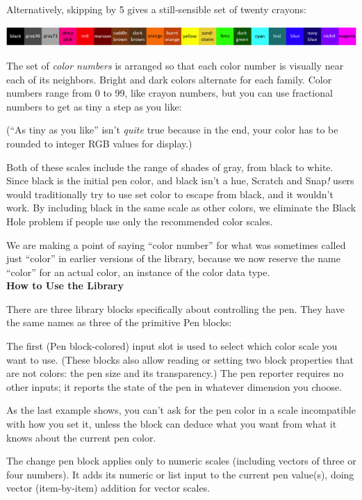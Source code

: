 Alternatively, skipping by 5 gives a still-sensible set of twenty
crayons:

\includegraphics[width=5.8in,height=0.3in]{media/image1155.png}

The set of \emph{color numbers} is arranged so that each color number is
visually near each of its neighbors. Bright and dark colors alternate
for each family. Color numbers range from 0 to 99, like crayon numbers,
but you can use fractional numbers to get as tiny a step as you like:

(``As tiny as you like'' isn't \emph{quite} true because in the end,
your color has to be rounded to integer RGB values for display.)

Both of these scales include the range of shades of gray, from black to
white. Since black is the initial pen color, and black isn't a hue,
Scratch and Snap\emph{!} users would traditionally try to use set color
to escape from black, and it wouldn't work. By including black in the
same scale as other colors, we eliminate the Black Hole problem if
people use only the recommended color scales.

We are making a point of saying ``color number'' for what was sometimes
called just ``color'' in earlier versions of the library, because we now
reserve the name ``color'' for an actual color, an instance of the color
data type.\\
\textbf{How to Use the Library}

There are three library blocks specifically about controlling the pen.
They have the same names as three of the primitive Pen blocks:

The first (Pen block-colored) input slot is used to select which color
scale you want to use. (These blocks also allow reading or setting two
block properties that are not colors: the pen size and its
transparency.) The pen reporter requires no other inputs; it reports the
state of the pen in whatever dimension you choose.

As the last example shows, you can't ask for the pen color in a scale
incompatible with how you set it, unless the block can deduce what you
want from what it knows about the current pen color.

The change pen block applies only to numeric scales (including vectors
of three or four numbers). It adds its numeric or list input to the
current pen value(s), doing vector (item-by-item) addition for vector
scales.

